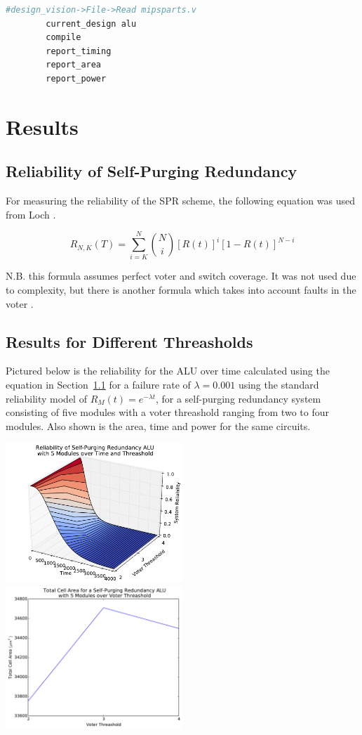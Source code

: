 \documentclass[a4paper,12pt]{article}
\begin{document}
    \begin{lstlisting}[language=Bash,
        commentstyle=\color{comment}]
        #design_vision->File->Read mipsparts.v
        current_design alu
        compile
        report_timing
        report_area
        report_power
    \end{lstlisting}

    \section{Results}

    \subsection{Reliability of Self-Purging Redundancy}
    \label{subsec:equation}

    For measuring the reliability of the SPR scheme, the following equation was used from Loch \cite[~Section 3-A]{1674656}.

    $$R_{N,K}(T) = \sum_{i = K}^{N} {N \choose i}\left[R(t)\right]^i\left[1 - R(t)\right]^{N - i} $$

    N.B. this formula assumes perfect voter and switch coverage. It was not used due to complexity, but there is another formula which takes into account faults in the voter \cite[~Section 3-B]{1674656}.

    \subsection{Results for Different Threasholds}
    \label{subsec:threasholds}

    Pictured below is the reliability for the ALU over time calculated using the equation in Section~\ref{subsec:equation} for a failure rate of $\lambda = 0.001$ using the standard reliability model of $R_M(t) = e^{-\lambda t}$, for a self-purging redundancy system consisting of five modules with a voter threashold ranging from two to four modules. Also shown is the area, time and power for the same circuits.

    \includegraphics[width=0.5\textwidth]{reliability_5}
    \includegraphics[width=0.5\textwidth]{area_5}
\end{document}
